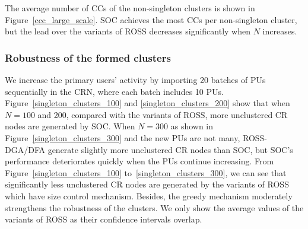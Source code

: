 \documentclass[times]{ettauth}
\newcommand{\ie}{i.e., }
\theoremstyle{mytheoremstyle}
\theoremstyle{mytheoremstyle}
\theoremstyle{mytheoremstyle}
\begin{document}
The average number of CCs of the non-singleton clusters is shown in Figure~\ref{ccc_large_scale}.
SOC achieves the most CCs per non-singleton cluster, but the lead over the variants of ROSS decreases significantly when $N$ increases.




\subsubsection{Robustness of the formed clusters}
We increase the primary users' activity by importing 20 batches of PUs sequentially in the CRN, where each batch includes 10 PUs. 
%
Figure~\ref{singleton_clusters_100} and \ref{singleton_clusters_200} show that when $N=100$ and 200, compared with the variants of ROSS, more unclustered CR nodes are generated by SOC.
When $N=300$ as shown in Figure~\ref{singleton_clusters_300} and the new PUs are not many, ROSS-DGA/DFA generate slightly more unclustered CR nodes than SOC, but SOC's performance deteriorates quickly when the PUs continue increasing.
%
From Figure~\ref{singleton_clusters_100} to~\ref{singleton_clusters_300}, we can see that significantly less unclustered CR nodes are generated by the variants of ROSS which have size control mechanism.
Besides, the greedy mechanism moderately strengthens the robustness of the clusters.
We only show the average values of the variants of ROSS as their confidence intervals overlap.
\end{document}
